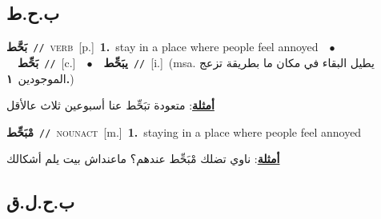 \documentclass[10pt,a4paper,twoside]{article} %
\begin{document}
\begin{multicols}{2}
\vspace{-3mm}
\subsection*{\color{blue}\foreignlanguage{arabic}{ب.ح.ط}\color{blue}{}} 

{\setlength\topsep{0pt}\textbf{\foreignlanguage{arabic}{بَحَّط}}\ {\color{gray}\texttt{//}\color{black}}\ \textsc{verb}\ [p.]\ \textbf{1.}~stay in a place where people feel annoyed\ \ $\bullet$\ \ \setlength\topsep{0pt}\textbf{\foreignlanguage{arabic}{بَحِّط}}\ {\color{gray}\texttt{//}\color{black}}\ [c.]\ \ $\bullet$\ \ \setlength\topsep{0pt}\textbf{\foreignlanguage{arabic}{يبَحِّط}}\ {\color{gray}\texttt{//}\color{black}}\ [i.]\ \color{gray}(msa. \foreignlanguage{arabic}{يطيل البقاء في مكان ما بطريقة تزعج الموجودين}~\foreignlanguage{arabic}{\textbf{١.}})\color{black}\  \begin{flushright}\color{gray}\foreignlanguage{arabic}{\textbf{\underline{\foreignlanguage{arabic}{أمثلة}}}: متعودة تبَحِّط عنا أسبوعين ثلاث عالأقل}\end{flushright}\color{black}} \vspace{2mm}

{\setlength\topsep{0pt}\textbf{\foreignlanguage{arabic}{مْبَحِّط}}\ {\color{gray}\texttt{//}\color{black}}\ \textsc{noun\textunderscore act}\ [m.]\ \textbf{1.}~staying in a place where people feel annoyed\  \begin{flushright}\color{gray}\foreignlanguage{arabic}{\textbf{\underline{\foreignlanguage{arabic}{أمثلة}}}: ناوي تضلك مْبَحِّط عندهم؟ ماعنداش بيت يلم أشكالك}\end{flushright}\color{black}} \vspace{2mm}

\vspace{-3mm}
\subsection*{\color{blue}\foreignlanguage{arabic}{ب.ح.ل.ق}\color{blue}{}} 


\end{multicols}
\end{document}
